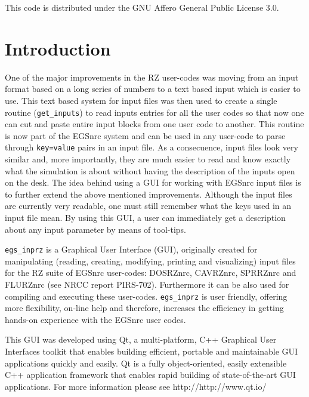 \documentclass[12pt,twoside]{article}   %
\begin{document}
\noindent
This code is distributed under the GNU Affero General Public License 3.0.


\tableofcontents


\newpage

\section{Introduction}

One of the major improvements in the RZ user-codes was moving from an input format
based on a long series of numbers to a text based input which is easier to use.
This text based system for input files was then used to create a single routine
({\tt get\_inputs}) to read inputs entries for all the user codes so that now
one can cut and paste entire input blocks from one user code to another.
This routine is now part of the EGSnrc system and can be used in any user-code to
parse through {\tt key=value} pairs in an input file.
As a consecuence, input files look very similar and,
more importantly, they are much easier to read and know exactly what the simulation
is about without having the description of the inputs open on the desk.
The idea behind using a GUI for working with EGSnrc input files is to further
extend the above mentioned improvements. Although the input files are currently
very readable, one must still remember what the keys used in an input file mean.
By using this GUI, a user can immediately get a description about any input parameter
by means of tool-tips.

{\tt egs\_inprz} is a Graphical User Interface (GUI), originally created for manipulating
(reading, creating, modifying, printing and visualizing)
input files for the  RZ suite of EGSnrc  user-codes:
DOSRZnrc, CAVRZnrc, SPRRZnrc and FLURZnrc (see NRCC report PIRS-702\cite{Ro10}).
Furthermore it can be also used for compiling and executing these user-codes.
 {\tt egs\_inprz} is user friendly, offering more flexibility, on-line help and therefore,
increases the efficiency in getting hands-on experience with the EGSnrc user codes.

 This GUI was developed using Qt, a multi-platform, C++ Graphical User Interfaces toolkit
 that enables building efficient, portable and maintainable GUI applications
 quickly and easily. Qt is a fully object-oriented, easily extensible C++ application
 framework that enables rapid building of state-of-the-art GUI applications. For more
 information please see 
{http://http://www.qt.io/}
\end{document}
